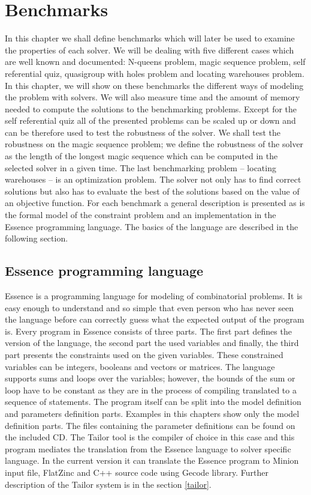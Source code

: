\chapter{Benchmarks}
\label{benchmarks}

In this chapter we shall define benchmarks which will later be used to examine the properties of each solver. We will be dealing with five different cases which are well known and documented: N-queens problem, magic sequence problem, self referential quiz, quasigroup with holes problem and locating warehouses problem. In this chapter, we will show on these benchmarks the different ways of modeling the problem with solvers.
We will also measure time and the amount of memory needed to compute the solutions to the benchmarking 
problems. Except for the self referential quiz all of the presented problems can be scaled up or down
and can be therefore used to test the robustness of the solver. We shall test the robustness on the 
magic sequence problem; we define the robustness of the solver as the length of
the longest magic sequence which can be computed in the selected solver in a given 
time. The last benchmarking problem -- locating warehouses -- is an optimization
problem. The solver not only has to find correct solutions but also has to evaluate the best of the
solutions based on the value of an objective function. For each benchmark 
a general description is presented as is the formal model of the constraint problem and an implementation in
the Essence  programming language. The basics of the language are described in the following 
section.

\section{Essence programming language}
Essence is a programming language for modeling of combinatorial problems. It is 
easy enough to understand and so simple that even person who has never seen the
language before can correctly guess what the expected output of the program is. Every program in Essence 
consists of three parts. The first part defines the version of the language, the second
part the used variables and finally, the third part presents the constraints used on the given 
variables. These constrained variables can be integers, booleans and vectors or matrices.
The language supports sums and loops over the variables; however, the bounds of the
sum or loop have to be constant as they are in the process of compiling translated
to a sequence of statements. The program itself can be split into the model definition
and parameters definition parts. Examples in this chapters show only the model 
definition parts. The files containing the parameter definitions can be found on the included CD.
The Tailor tool is the compiler of choice in this case and this program mediates the translation from the Essence language to solver specific language. In the current version it can translate the Essence program to Minion 
input file, FlatZinc and C++ source code using Gecode library. Further description of
the Tailor system is in the section \ref{tailor}.

